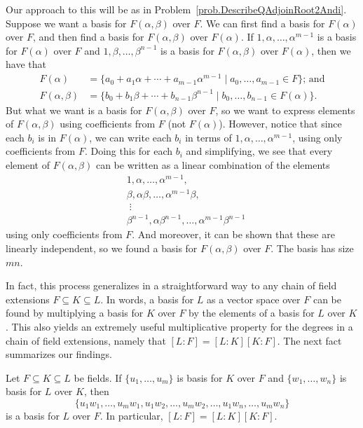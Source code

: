 Our approach to this will be as in Problem~\ref{prob.DescribeQAdjoinRoot2Andi}. Suppose we want a basis for $F(\alpha,\beta)$ over $F$. We can first find a basis for $F(\alpha)$ over $F$, and then find a basis for $F(\alpha,\beta)$ over $F(\alpha)$. If $1,\alpha,\ldots,\alpha^{m-1}$ is a basis for $F(\alpha)$ over $F$ and $1,\beta,\ldots,\beta^{n-1}$ is a basis for $F(\alpha,\beta)$ over $F(\alpha)$, then we have that 
\begin{align*}
F(\alpha) &= \{a_0+a_1\alpha+\cdots+a_{m-1}\alpha^{m-1}\mid a_0,\ldots,a_{m-1} \in F\}\text{; and}\\
F(\alpha,\beta) &= \{b_0+b_1\beta+\cdots+b_{n-1}\beta^{n-1}\mid b_0,\ldots,b_{n-1}\in F(\alpha)\}.
\end{align*}
But what we want is a basis for $F(\alpha,\beta)$ over $F$, so we want to express elements of $F(\alpha,\beta)$ using coefficients from $F$ (not $F(\alpha)$). However, notice that since each $b_i$ is in $F(\alpha)$, we can write each $b_i$ in terms of $1,\alpha,\ldots,\alpha^{m-1}$, using only coefficients from $F$. Doing this for each $b_i$ and simplifying, we see that every element of $F(\alpha,\beta)$ can be written as a linear combination of the elements
\begin{align*}
&1,\alpha,\ldots, \alpha^{m-1},\\ 
&\beta,\alpha\beta,\ldots, \alpha^{m-1}\beta,\\
&\;\vdots\\
&\beta^{n-1},\alpha\beta^{n-1},\ldots, \alpha^{m-1}\beta^{n-1}
\end{align*}
using only coefficients from $F$. And moreover, it can be shown that these are linearly independent, so we found a basis for $F(\alpha,\beta)$ over $F$. The basis has size $mn$.

In fact, this process generalizes in a straightforward way to any chain of field extensions $F\subseteq K \subseteq L$. In words, a basis for $L$ as a vector space over $F$ can be found by multiplying a basis for $K$ over $F$ by the elements of a basis for $L$ over $K$. This also yields an extremely useful multiplicative property for the degrees in a chain of field extensions, namely that $[L:F] = [L:K][K:F]$. The next fact summarizes our findings.

\begin{fact}\label{fact.BasisChainExtensionField}
Let $F\subseteq K \subseteq L$ be fields. If $\{u_1,\ldots,u_m\}$ is basis for $K$ over $F$ and $\{w_1,\ldots,w_n\}$ is basis for $L$ over $K$, then 
\[ \{u_1w_1,\ldots,u_mw_1,u_1w_2,\ldots,u_mw_2,\ldots,u_1w_n,\ldots,u_mw_n\}\]
is a basis for $L$ over $F$. In particular, $[L:F] = [L:K][K:F]$.
\end{fact}

